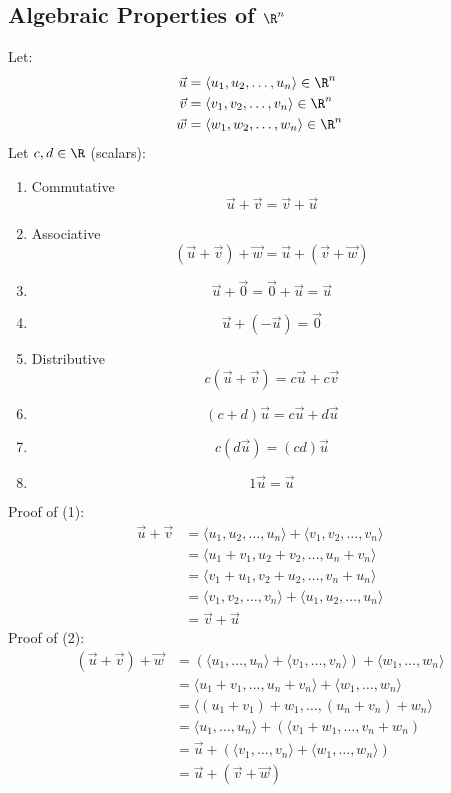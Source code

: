 \documentclass[letterpaper, 12pt]{math}
\begin{document}
\subsection*{Algebraic Properties of \( \R^n \)}
Let:
\begin{align*}
  \vec{u} &= \langle u_{1},u_{2},\dots,u_{n}\rangle\in\R^{n} \\
  \vec{v} &= \langle v_{1},v_{2},\dots,v_{n}\rangle\in\R^{n} \\
  \vec{w} &= \langle w_{1},w_{2},\dots,w_{n}\rangle\in\R^{n}
\end{align*}
Let \( c,d\in\R \) (scalars):
\begin{enumerate}
  \item Commutative
    \[ \vec{u}+\vec{v} = \vec{v}+\vec{u} \]
  \item Associative
    \[ (\vec{u}+\vec{v})+\vec{w} = \vec{u}+(\vec{v}+\vec{w}) \]
  \item
    \[ \vec{u}+\vec{0} = \vec{0}+\vec{u} = \vec{u} \]
  \item
    \[ \vec{u}+(-\vec{u}) = \vec{0} \]
  \item Distributive
    \[ c(\vec{u}+\vec{v}) = c\vec{u}+c\vec{v} \]
  \item
    \[ (c+d)\vec{u} = c\vec{u}+d\vec{u} \]
  \item
    \[ c(d\vec{u}) = (cd)\vec{u} \]
  \item
    \[ 1\vec{u} = \vec{u} \]
\end{enumerate}
Proof of (1):
\begin{align*}
  \vec{u}+\vec{v} &= \langle u_{1},u_{2},\dots,u_{n}\rangle+
    \langle v_{1},v_{2},\dots,v_{n}\rangle \\
  &= \langle u_{1}+v_{1},u_{2}+v_{2},\dots,u_{n}+v_{n}\rangle \\
  &= \langle v_{1}+u_{1},v_{2}+u_{2},\dots,v_{n}+u_{n}\rangle \\
  &= \langle v_{1},v_{2},\dots,v_{n}\rangle+
    \langle u_{1},u_{2},\dots,u_{n}\rangle \\
  &= \vec{v}+\vec{u}
\end{align*}
Proof of (2):
\begin{align*}
  (\vec{u}+\vec{v})+\vec{w} &= (\langle u_{1},\dots,u_{n}\rangle+
    \langle v_{1},\dots,v_{n}\rangle)+\langle w_{1},\dots,w_{n}\rangle \\
  &= \langle u_{1}+v_{1},\dots,u_{n}+v_{n}\rangle+
    \langle w_{1},\dots,w_{n}\rangle \\
  &= \langle(u_{1}+v_{1})+w_{1},\dots,(u_{n}+v_{n})+w_{n}\rangle \\
  &= \langle u_{1},\dots,u_{n}\rangle +
    (\langle v_{1}+w_{1},\dots,v_{n}+w_{n}) \\
  &= \vec{u}+(\langle v_{1},\dots,v_{n}\rangle+
    \langle w_{1},\dots,w_{n}\rangle) \\
  &= \vec{u}+(\vec{v}+\vec{w})
\end{align*}
\end{document}
